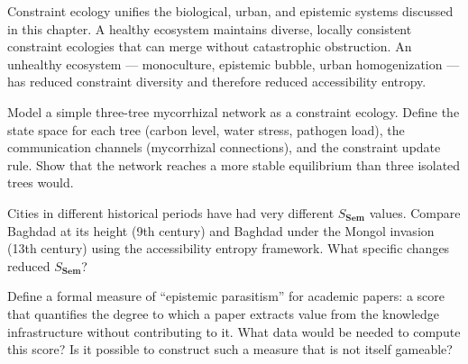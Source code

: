 Constraint ecology unifies the biological, urban, and epistemic systems
discussed in this chapter. A healthy ecosystem maintains diverse, locally
consistent constraint ecologies that can merge without catastrophic
obstruction. An unhealthy ecosystem — monoculture, epistemic bubble,
urban homogenization — has reduced constraint diversity and therefore
reduced accessibility entropy.

\begin{exercise}
  Model a simple three-tree mycorrhizal network as a constraint ecology.
  Define the state space for each tree (carbon level, water stress,
  pathogen load), the communication channels (mycorrhizal connections),
  and the constraint update rule. Show that the network reaches a more
  stable equilibrium than three isolated trees would.
\end{exercise}

\begin{exercise}
  Cities in different historical periods have had very different
  $S_{\mathbf{Sem}}$ values. Compare Baghdad at its height (9th century)
  and Baghdad under the Mongol invasion (13th century) using the
  accessibility entropy framework. What specific changes reduced
  $S_{\mathbf{Sem}}$?
\end{exercise}

\begin{exercise}[title={Open problem}]
  Define a formal measure of ``epistemic parasitism'' for academic papers:
  a score that quantifies the degree to which a paper extracts value
  from the knowledge infrastructure without contributing to it. What
  data would be needed to compute this score? Is it possible to construct
  such a measure that is not itself gameable?
\end{exercise}

